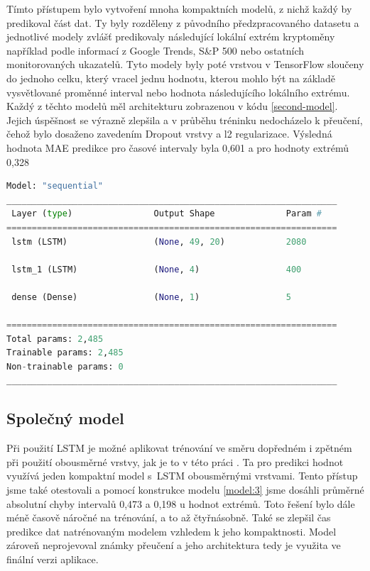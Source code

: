 Tímto přístupem bylo vytvoření mnoha kompaktních modelů, z nichž každý by predikoval část dat. 
Ty byly rozděleny z původního předzpracovaného datasetu a jednotlivé modely zvlášť predikovaly následující lokální extrém kryptoměny například podle informací z Google Trends, S\&P 500 nebo ostatních monitorovaných ukazatelů. 
Tyto modely byly poté vrstvou v TensorFlow sloučeny do jednoho celku, který vracel jednu hodnotu, kterou mohlo být na základě vysvětlované proměnné interval nebo hodnota následujícího lokálního extrému. 
Každý z těchto modelů měl architekturu zobrazenou v kódu \ref{second-model}. 
Jejich úspěšnost se výrazně zlepšila a v průběhu tréninku nedocházelo k přeučení, čehož bylo dosaženo zavedením Dropout vrstvy a l2 regularizace. 
Výsledná hodnota MAE predikce pro časové intervaly byla 0,601 a pro hodnoty extrémů 0,328

\begin{lstlisting}[caption={~2. model pro predikci},label=second-model,captionpos=t,float,abovecaptionskip=-\medskipamount,belowcaptionskip=\medskipamount,language=Python]
Model: "sequential"
_________________________________________________________________
 Layer (type)                Output Shape              Param #   
=================================================================
 lstm (LSTM)                 (None, 49, 20)            2080      
                                                                 
 lstm_1 (LSTM)               (None, 4)                 400       
                                                                 
 dense (Dense)               (None, 1)                 5         
                                                                 
=================================================================
Total params: 2,485
Trainable params: 2,485
Non-trainable params: 0
_________________________________________________________________
\end{lstlisting}

\subsection{Společný model}

Při použití LSTM je možné aplikovat trénování ve směru dopředném i zpětném při použití obousměrné vrstvy, jak je to v této práci  \cite{predict-model}.
Ta pro predikci hodnot využívá jeden kompaktní model s~LSTM obousměrnými vrstvami. 
Tento přístup jsme také otestovali a pomocí konstrukce modelu \ref{model:3} jsme dosáhli průměrné absolutní chyby intervalů 0,473 a 0,198 u hodnot extrémů. 
Toto řešení bylo dále méně časově náročné na trénování, a to až čtyřnásobně. 
Také se zlepšil čas predikce dat natrénovaným modelem vzhledem k jeho kompaktnosti. 
Model zároveň neprojevoval známky přeučení a jeho architektura tedy je využita ve finální verzi aplikace.

